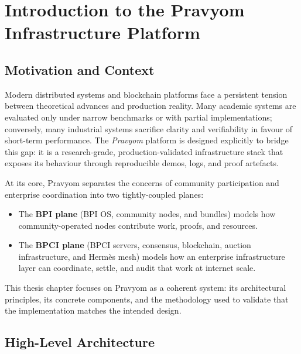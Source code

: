 %
%   

\chapter{Introduction to the Pravyom Infrastructure Platform}

\section{Motivation and Context}

Modern distributed systems and blockchain platforms face a persistent tension between theoretical advances and production reality. Many academic systems are evaluated only under narrow benchmarks or with partial implementations; conversely, many industrial systems sacrifice clarity and verifiability in favour of short-term performance. The \emph{Pravyom} platform is designed explicitly to bridge this gap: it is a research-grade, production-validated infrastructure stack that exposes its behaviour through reproducible demos, logs, and proof artefacts.

At its core, Pravyom separates the concerns of community participation and enterprise coordination into two tightly-coupled planes:

\begin{itemize}
  \item The \textbf{BPI plane} (BPI OS, community nodes, and bundles) models how community-operated nodes contribute work, proofs, and resources.
  \item The \textbf{BPCI plane} (BPCI servers, consensus, blockchain, auction infrastructure, and Herm\`es mesh) models how an enterprise infrastructure layer can coordinate, settle, and audit that work at internet scale.
\end{itemize}

This thesis chapter focuses on Pravyom as a coherent system: its architectural principles, its concrete components, and the methodology used to validate that the implementation matches the intended design.

\section{High-Level Architecture}

